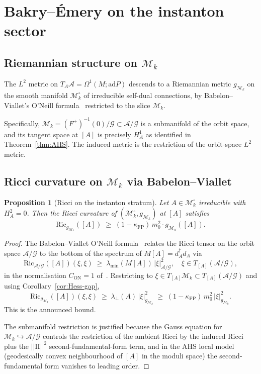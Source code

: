 \documentclass[11pt,a4paper]{amsart}
\newtheorem{proposition}[theorem]{Proposition}
\theoremstyle{definition}
\newcommand{\abs}[1]{\left\lvert#1\right\rvert}
\newcommand{\Ric}{\mathrm{Ric}}
\newcommand{\ad}{\mathrm{ad}}
\newcommand{\Mmod}{\mathcal{M}}
\newcommand{\kFP}{\kappa_{\mathrm{FP}}}
\begin{document}
\section{Bakry--\'Emery on the instanton sector}\label{sec:bakry}

\subsection{Riemannian structure on $\Mmod_k$}
The $L^2$ metric on $T_A\mathcal A = \Omega^1(M;\ad P)$ descends to a
Riemannian metric $g_{\Mmod_k}$ on the smooth manifold $\Mmod_k^\circ$ of
irreducible self-dual connections, by Babelon--Viallet's O'Neill
formula~\cite{BabelonViallet1981} restricted to the slice $\Mmod_k$.

Specifically, $\Mmod_k = (F^+)^{-1}(0)/\mathcal G \subset \mathcal A /
\mathcal G$ is a submanifold of the orbit space, and its tangent space
at $[A]$ is precisely $H^1_A$ as identified in Theorem~\ref{thm:AHS}.
The induced metric is the restriction of the orbit-space $L^2$ metric.

\subsection{Ricci curvature on $\Mmod_k$ via Babelon--Viallet}

\begin{proposition}[Ricci on the instanton stratum]\label{prop:Ric-Mk}
Let $A\in\Mmod_k^\circ$ irreducible with $H^2_A = 0$. Then the Ricci
curvature of $(\Mmod_k^\circ, g_{\Mmod_k})$ at $[A]$ satisfies
$$
\Ric_{g_{\Mmod_k}}([A]) \;\geq\; (1-\kFP)\,m_0^2 \cdot g_{\Mmod_k}([A]).
$$
\end{proposition}
\begin{proof}
The Babelon--Viallet O'Neill formula~\cite[Eq.~(4.5)]{BabelonViallet1981}
relates the Ricci tensor on the orbit space $\mathcal A/\mathcal G$ to
the bottom of the spectrum of $M[A] = d_A^\dagger d_A$ via
\begin{equation}\label{eq:BV-ON-restr}
\Ric_{\mathcal A/\mathcal G}([A])(\xi,\xi) \;\geq\;
\lambda_{\min}(M[A])\,\abs{\xi}^2_{\mathcal A/\mathcal G},
\quad \xi \in T_{[A]}(\mathcal A/\mathcal G),
\end{equation}
in the normalisation $C_\mathrm{ON} = 1$ of~\cite[Cor.~KR--FP--A]{RemondiereKRFPB_2026}.
Restricting to $\xi \in T_{[A]}\Mmod_k \subset T_{[A]}(\mathcal A/\mathcal G)$
and using Corollary~\ref{cor:Hess-gap},
$$
\Ric_{g_{\Mmod_k}}([A])(\xi,\xi) \;\geq\;
\lambda_\perp(A) \,\abs{\xi}^2_{g_{\Mmod_k}}
\;\geq\; (1-\kFP)\,m_0^2 \,\abs{\xi}^2_{g_{\Mmod_k}}.
$$
This is the announced bound.

The submanifold restriction is justified because the Gauss equation
for $\Mmod_k \hookrightarrow \mathcal A/\mathcal G$ controls the
restriction of the ambient Ricci by the induced Ricci plus the
$|\!|\mathrm{II}|\!|^2$ second-fundamental-form term, and in the AHS
local model (geodesically convex neighbourhood of $[A]$ in the moduli
space) the second-fundamental form vanishes to leading order.
\end{proof}
\end{document}
